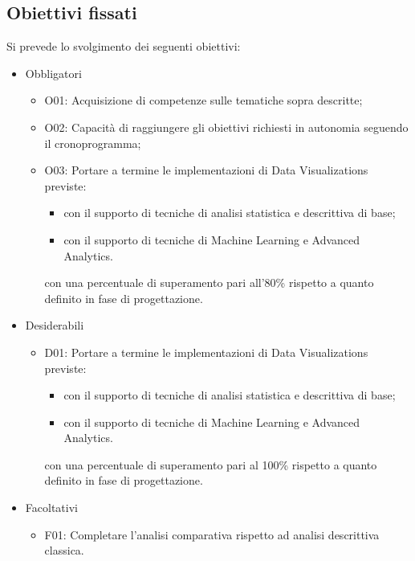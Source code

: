 \subsection*{Obiettivi fissati}
Si prevede lo svolgimento dei seguenti obiettivi:
\begin{itemize}
	\item Obbligatori
	\begin{itemize}
		\item O01: Acquisizione di competenze sulle tematiche sopra descritte;
		\item O02: Capacità di raggiungere gli obiettivi richiesti in autonomia seguendo il cronoprogramma;
		\item O03: Portare a termine le implementazioni di Data Visualizations previste:
		\begin{itemize}
		\item con il supporto di tecniche di analisi statistica e descrittiva di base;
		\item con il supporto di tecniche di Machine Learning e Advanced Analytics.
\end{itemize}		 con una percentuale di superamento pari all'80\% rispetto a quanto definito in fase di progettazione.
	\end{itemize}
	\item Desiderabili 
	\begin{itemize}
		\item D01:  Portare a termine le implementazioni di Data Visualizations previste:
		\begin{itemize}
		\item con il supporto di tecniche di analisi statistica e descrittiva di base;
		\item con il supporto di tecniche di Machine Learning e Advanced Analytics.
\end{itemize} con una percentuale di superamento pari al 100\% rispetto a quanto definito in fase di progettazione.
	\end{itemize}
	
	\item Facoltativi
	\begin{itemize}
		\item F01: Completare l'analisi comparativa rispetto ad analisi descrittiva classica.
	\end{itemize} 
\end{itemize}

\newpage